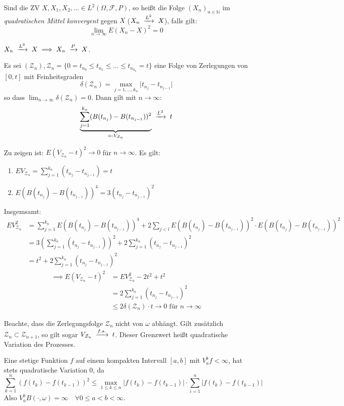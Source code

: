 \documentclass[a4paper,twoside,DIV15,BCOR12mm]{scrbook}
\newcommand{\cF}{\mathcal F}
\begin{document}
\begin{definition}
  Sind die ZV $X,X_1,X_2,\dots\in L^2(\Omega,\cF,P)$, so heißt die Folge $(X_n)_{n\in\mathbb N}$ im \emph{quadratischen Mittel konvergent} gegen $X$ ($X_n\tomit{L^2} X$), falls gilt:
\[
\lim_{n\rightarrow\infty}E(X_n-X)^2=0
\]
\end{definition}
\begin{bemerkung}
  $X_n\tomit{L^2}X\implies X_n\tomit{P}X$.
\end{bemerkung}
\begin{satz}
  \label{Satz 11.3}
  Es sei $(\mathcal Z_n), \mathcal Z_n=\{0=t_{n_0}\leq t_{n_1}\leq\dots\leq t_{n_{k_n}}=t\}$ eine Folge von Zerlegungen von $[0,t]$ mit Feinheitsgraden
\[
\delta(\mathcal Z_n)=\max_{j=1,\dots,k_n}\vert t_{n_j}-t_{n_{j-1}}\vert
\]
so dass $\lim_{n\rightarrow\infty}\delta(\mathcal Z_n)=0$. Dann gilt mit $n\to\infty$:
\[
\underbrace{\sum_{j=1}^{k_n}(B(t_{n_j})-B(t_{n_{j-1}}))^2}_{=:V_{\mathcal Z_n}}\tomit{L^2}t
\] 
\end{satz}
\begin{beweis}
  Zu zeigen ist: $E(V_{\mathcal Z_n}-t)^2\to 0$ für $n\to\infty$. Es gilt:
  \begin{enumerate}
  \item $EV_{\mathcal Z_n}=\sum_{j=1}^{k_n}(t_{n_j}-t_{n_{j-1}})=t$
  \item $E(B(t_{n_j})-B(t_{n_{j-1}}))^4=3(t_{n_j}-t_{n_{j-1}})^2$
  \end{enumerate}
Insgemsamt:
\begin{align*}
  EV_{\mathcal Z_n}^2 &= \sum_{j=1}^{k_n}E(B(t_{n_j})-B(t_{n_{j-1}}))^4+2\sum_{j<l}E(B(t_{n_j})-B(t_{n_{j-1}}))^2\cdot E(B(t_{n_j})-B(t_{n_{j-1}}))^2 \\
&=3\left(\sum_{j=1}^{k_n}(t_{n_j}-t_{n_{j-1}})\right)^2+2\sum_{j=1}^{k_n}(t_{n_j}-t_{n_{j-1}})^2 \\
&=t^2+2\sum_{j=1}^{k_n}(t_{n_j}-t_{n_{j-1}})^2
\end{align*}
\begin{align*}
  \implies E(V_{\mathcal Z_n}-t)^2 &= EV_{\mathcal Z_n}^2-2t^2+t^2 \\
&= 2\sum_{j=1}^{k_n}(t_{n_j}-t_{n_{j-1}})^2 \\
& \leq 2\delta(\mathcal Z_n)\cdot t\to 0 \text{ für } n\to\infty
\end{align*}
\end{beweis}
\begin{bemerkung}
  Beachte, dass die Zerlegungsfolge $\mathcal Z_n$ nicht von $\omega$ abhängt. Gilt zusätzlich $\mathcal Z_n\subset\mathcal Z_{n+1}$, so gilt sogar $V_{\mathcal Z_n}\tomit{f.s.}t$. Dieser Grenzwert heißt quadratische Variation des Prozesses.
\end{bemerkung}
\begin{bemerkung}
  Eine stetige Funktion $f$ auf einem kompakten Intervall $[a,b]$ mit $V_a^bf<\infty$, hat stets quadratische Variation $0$, da
  \[
    \sum_{k=1}^n(f(t_k)-f(t_{k-1}))^2 \leq\max_{1\leq k\leq n}\vert f(t_k)-f(t_{k-1})\vert\cdot\sum_{i=1}^n\vert f(t_k)-f(t_{k-1})\vert
  \]
Also $V_a^b B(\cdot,\omega)=\infty\quad\forall 0\leq a<b<\infty$.
\end{bemerkung}
\end{document}
